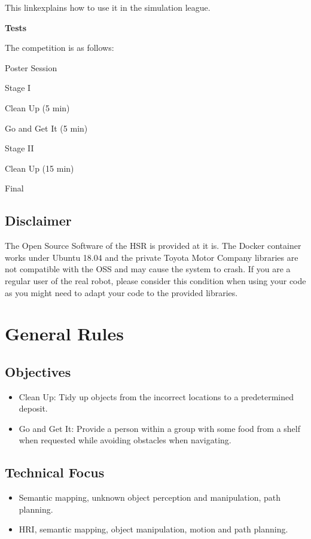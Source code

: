 \documentclass{article}
\newcommand{\SubItem}[1]{
    {\setlength\itemindent{15pt} \item[-] #1}
}
\begin{document}
\vspace{5mm}
This link\footnotemark explains how to use it in the simulation league.


\vspace{5mm}
\textbf{Tests}

The competition is as follows:

\begin{itemize}
    \item Poster Session
    \item Stage I
        \SubItem{Clean Up (5 min)}
        \SubItem{Go and Get It (5 min)}
    \item Stage II
        \SubItem{Clean Up (15 min)}
    \item Final
\end{itemize}

\subsection{Disclaimer}

The Open Source Software of the HSR is provided at it is. The Docker container works under Ubuntu 18.04 and the private Toyota Motor Company libraries are not compatible with the OSS and may cause the system to crash. If you are a regular user of the real robot, please consider this condition when using your code as you might need to adapt your code to the provided libraries.

\clearpage
\section{General Rules}

\subsection{Objectives}
\begin{itemize}
    \item Clean Up: Tidy up objects from the incorrect locations to a predetermined deposit.
    \item Go and Get It: Provide a person within a group with some food from a shelf when requested while avoiding obstacles when navigating.
\end{itemize}

\subsection{Technical Focus}
\begin{itemize}
    \item Semantic mapping, unknown object perception and manipulation, path planning.
    \item HRI, semantic mapping, object manipulation, motion and path planning.
\end{itemize}
\end{document}
